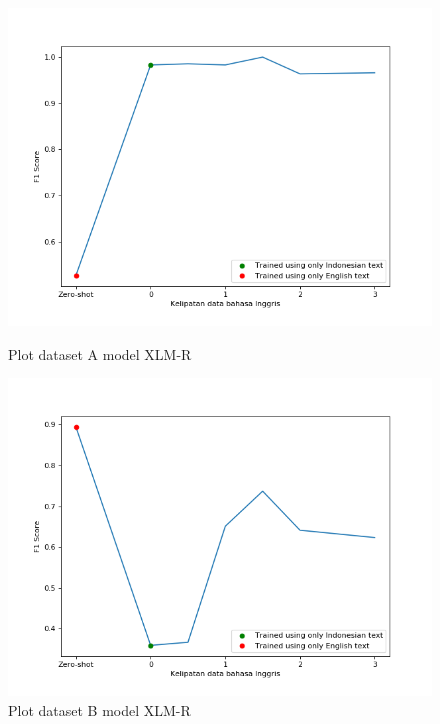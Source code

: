         \begin{figure}[ht]
              \includegraphics[width=\linewidth]{resources/plot-full-prosa-xlmr.png}
              \caption{Plot dataset A model XLM-R}\label{fig:plot_full_prosa_xlmr}
            \endminipage\hfill
              \includegraphics[width=\linewidth]{resources/plot-full-trip-advisor-xlmr.png}
              \caption{Plot dataset B model XLM-R}\label{fig:plot_full_prosa_xlmr}
            \endminipage
        \end{figure}

